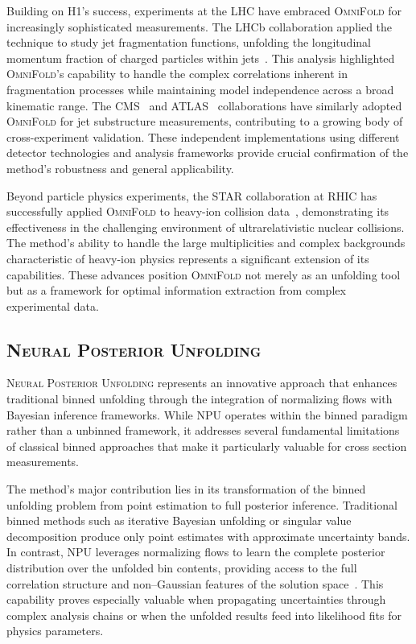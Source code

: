     Building on H1's success, experiments at the LHC have embraced \textsc{OmniFold} for increasingly sophisticated measurements.
    The LHCb collaboration applied the technique to study jet fragmentation functions, unfolding the longitudinal momentum fraction of charged particles within jets~\cite{collaboration_multidifferential_2023}.
    This analysis highlighted \textsc{OmniFold}'s capability to handle the complex correlations inherent in fragmentation processes while maintaining model independence across a broad kinematic range.
    The CMS~\cite{CMS:2025sws} and ATLAS~\cite{collaboration_measurement_2025,collaboration_simultaneous_2024,panJetSubstructureMeasurements2024} collaborations have similarly adopted \textsc{OmniFold} for jet substructure measurements, contributing to a growing body of cross-experiment validation.
    These independent implementations using different detector technologies and analysis frameworks provide crucial confirmation of the method's robustness and general applicability.
    
    Beyond particle physics experiments, the STAR collaboration at RHIC has successfully applied \textsc{OmniFold} to heavy-ion collision data~\cite{song_measurement_2023}, demonstrating its effectiveness in the challenging environment of ultrarelativistic nuclear collisions.
    The method's ability to handle the large multiplicities and complex backgrounds characteristic of heavy-ion physics represents a significant extension of its capabilities.
    These advances position \textsc{OmniFold} not merely as an unfolding tool but as a framework for optimal information extraction from complex experimental data.

\subsection{\textsc{Neural Posterior Unfolding}}
    \textsc{Neural Posterior Unfolding} represents an innovative approach that enhances traditional binned unfolding through the integration of normalizing flows with Bayesian inference frameworks.
    While NPU operates within the binned paradigm rather than a unbinned framework, it addresses several fundamental limitations of classical binned approaches that make it particularly valuable for cross section measurements.

    The method's major contribution lies in its transformation of the binned unfolding problem from point estimation to full posterior inference.
    Traditional binned methods such as iterative Bayesian unfolding or singular value decomposition produce only point estimates with approximate uncertainty bands.
    In contrast, NPU leverages normalizing flows to learn the complete posterior distribution over the unfolded bin contents, providing access to the full correlation structure and non--Gaussian features of the solution space~\cite{acosta2024npu}.
    This capability proves especially valuable when propagating uncertainties through complex analysis chains or when the unfolded results feed into likelihood fits for physics parameters.

